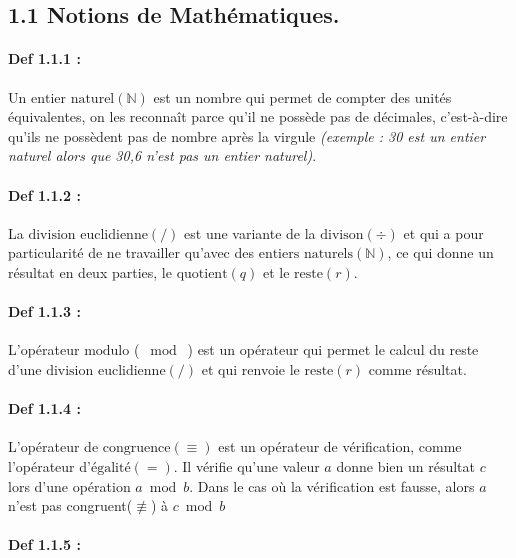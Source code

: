 \documentclass[
  paper=a4,
  ,captions=tableheading
]{scrartcl}
\begin{document}
\subsection{1.1 Notions de
Mathématiques.}\label{notions-de-mathuxe9matiques.}

\paragraph{Def 1.1.1 :}\label{def-1.1.1}

Un \(\text{entier naturel}(\mathbb{N})\) est un nombre qui permet de
compter des unités équivalentes, on les reconnaît parce qu'il ne possède
pas de décimales, c'est-à-dire qu'ils ne possèdent pas de nombre après
la virgule \emph{(exemple : 30 est un entier naturel alors que 30,6
n'est pas un entier naturel)}.

\paragraph{Def 1.1.2 :}\label{def-1.1.2}

La \(\text{division euclidienne}(/)\) est une variante de la
\(\text{divison}(\div)\) et qui a pour particularité de ne travailler
qu'avec des \(\text{entiers naturels}(\mathbb{N})\), ce qui donne un
résultat en deux parties, le \(\text{quotient}(q)\) et le
\(\text{reste}(r)\).

\paragraph{Def 1.1.3 :}\label{def-1.1.3}

L'opérateur \(\text{modulo}\) (\(\;\bmod\;\)) est un opérateur qui
permet le calcul du reste d'une \(\text{division euclidienne}(/)\) et
qui renvoie le \(\text{reste}(r)\) comme résultat.

\paragraph{Def 1.1.4 :}\label{def-1.1.4}

L'opérateur de \(\text{congruence}(\equiv)\) est un opérateur de
vérification, comme l'opérateur d'\(\text{égalité}(=)\). Il vérifie
qu'une valeur \(a\) donne bien un résultat \(c\) lors d'une opération
\(a \bmod b\). Dans le cas où la vérification est fausse, alors \(a\)
n'est pas congruent(\(\not\equiv\)) à \(c \bmod b\)

\paragraph{Def 1.1.5 :}\label{def-1.1.5}
\end{document}
